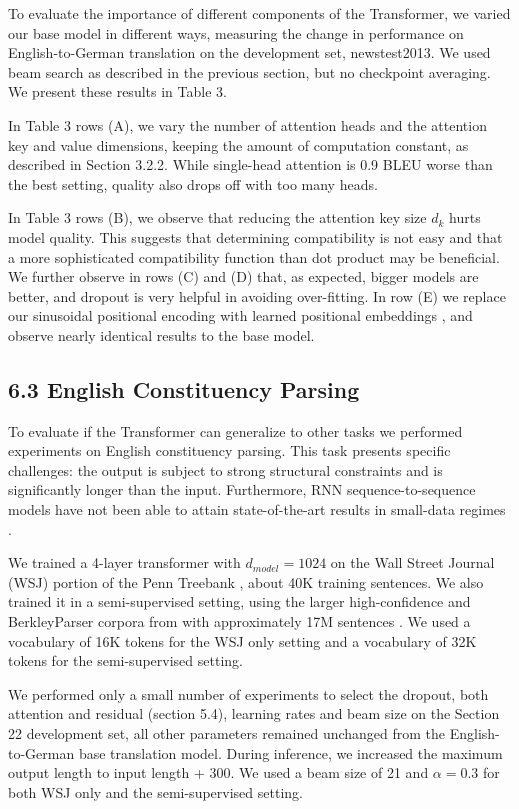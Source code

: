 \documentclass[conference]{IEEEtran}
\begin{document}
To evaluate the importance of different components of the Transformer, we varied our base model in different ways, measuring the change in performance on English-to-German translation on the development set, newstest2013. We used beam search as described in the previous section, but no checkpoint averaging. We present these results in Table 3.

In Table 3 rows (A), we vary the number of attention heads and the attention key and value dimensions, keeping the amount of computation constant, as described in Section 3.2.2. While single-head attention is 0.9 BLEU worse than the best setting, quality also drops off with too many heads.

In Table 3 rows (B), we observe that reducing the attention key size $d_k$ hurts model quality. This suggests that determining compatibility is not easy and that a more sophisticated compatibility function than dot product may be beneficial. We further observe in rows (C) and (D) that, as expected, bigger models are better, and dropout is very helpful in avoiding over-fitting. In row (E) we replace our sinusoidal positional encoding with learned positional embeddings \cite{ref9}, and observe nearly identical results to the base model.

\subsection{6.3 English Constituency Parsing}

To evaluate if the Transformer can generalize to other tasks we performed experiments on English constituency parsing. This task presents specific challenges: the output is subject to strong structural constraints and is significantly longer than the input. Furthermore, RNN sequence-to-sequence models have not been able to attain state-of-the-art results in small-data regimes \cite{ref37}.

We trained a 4-layer transformer with $d_{model} = 1024$ on the Wall Street Journal (WSJ) portion of the Penn Treebank \cite{ref25}, about 40K training sentences. We also trained it in a semi-supervised setting, using the larger high-confidence and BerkleyParser corpora from with approximately 17M sentences \cite{ref37}. We used a vocabulary of 16K tokens for the WSJ only setting and a vocabulary of 32K tokens for the semi-supervised setting.

We performed only a small number of experiments to select the dropout, both attention and residual (section 5.4), learning rates and beam size on the Section 22 development set, all other parameters remained unchanged from the English-to-German base translation model. During inference, we increased the maximum output length to input length + 300. We used a beam size of 21 and $\alpha = 0.3$ for both WSJ only and the semi-supervised setting.
\end{document}
